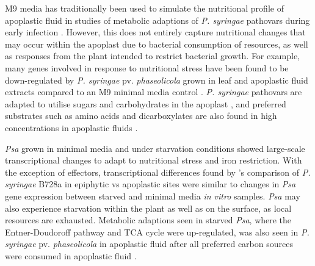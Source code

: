 M9 media has traditionally been used to simulate the nutritional profile of apoplastic fluid in studies of metabolic adaptions of \textit{P. syringae} pathovars during early infection \citep{Rahme_Mindrinos_Panopoulos_1992, OLeary_Neale_Geilfus_Jackson_Arnold_Preston_2016}. However, this does not entirely capture nutritional changes that may occur within the apoplast due to bacterial consumption of resources, as well as responses from the plant intended to restrict bacterial growth. For example, many genes involved in response to nutritional stress have been found to be down-regulated by \textit{P. syringae} pv. \textit{phaseolicola} grown in leaf and apoplastic fluid extracts compared to an M9 minimal media control \cite{Hernandez-Morales_De}. \textit{P. syringae} pathovars are adapted to utilise sugars and carbohydrates in the apoplast \citep{Rico2008-of}, and preferred substrates such as amino acids and dicarboxylates are also found in high concentrations in apoplastic fluids  \citep{OLeary_Neale_Geilfus_Jackson_Arnold_Preston_2016}. 

\textit{Psa} grown in minimal media and under starvation conditions showed large-scale transcriptional changes to adapt to nutritional stress and iron restriction. With the exception of effectors, transcriptional differences found by \cite{Yu-2013}'s comparison of \textit{P. syringae} B728a in epiphytic vs apoplastic sites were similar to changes in \textit{Psa} gene expression between starved and minimal media \textit{in vitro} samples. \textit{Psa} may also experience starvation within the plant as well as on the surface, as local resources are exhausted. Metabolic adaptions seen in starved \textit{Psa}, where the Entner-Doudoroff pathway and TCA cycle were up-regulated, was also seen in \textit{P. syringae} pv. \textit{phaseolicola} in apoplastic fluid after all preferred carbon sources were consumed in apoplastic fluid \citep{OLeary_Neale_Geilfus_Jackson_Arnold_Preston_2016}. 

